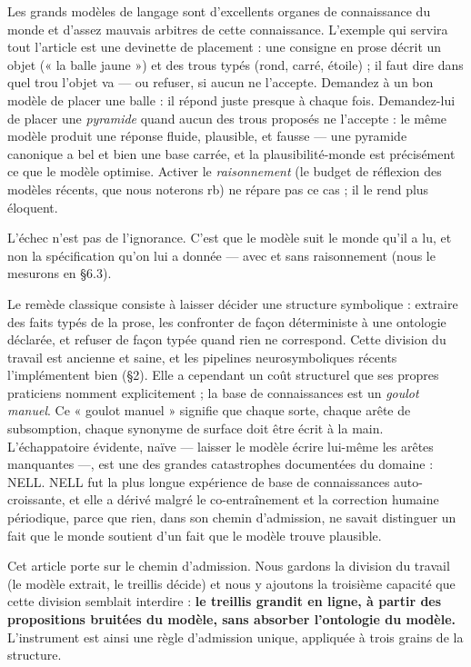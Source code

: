 \documentclass[11pt]{article}
\begin{document}
Les grands modèles de langage sont d'excellents organes de connaissance du monde et d'assez mauvais arbitres de cette connaissance. L'exemple qui servira tout l'article est une devinette de placement : une consigne en prose décrit un objet (« la balle jaune ») et des trous typés (rond, carré, étoile) ; il faut dire dans quel trou l'objet va — ou refuser, si aucun ne l'accepte. Demandez à un bon modèle de placer une balle : il répond juste presque à chaque fois. Demandez-lui de placer une \emph{pyramide} quand aucun des trous proposés ne l'accepte : le même modèle produit une réponse fluide, plausible, et fausse — une pyramide canonique a bel et bien une base carrée, et la plausibilité-monde est précisément ce que le modèle optimise. Activer le \emph{raisonnement} (le budget de réflexion des modèles récents, que nous noterons rb) ne répare pas ce cas ; il le rend plus éloquent.

L'échec n'est pas de l'ignorance. C'est que le modèle suit le monde qu'il a lu, et non la spécification qu'on lui a donnée — avec et sans raisonnement (nous le mesurons en §6.3).

Le remède classique consiste à laisser décider une structure symbolique : extraire des faits typés de la prose, les confronter de façon déterministe à une ontologie déclarée, et refuser de façon typée quand rien ne correspond. Cette division du travail est ancienne et saine, et les pipelines neurosymboliques récents l'implémentent bien (§2). Elle a cependant un coût structurel que ses propres praticiens nomment explicitement ; la base de connaissances est un \emph{goulot manuel}. Ce « goulot manuel » signifie que chaque sorte, chaque arête de subsomption, chaque synonyme de surface doit être écrit à la main. L'échappatoire évidente, naïve — laisser le modèle écrire lui-même les arêtes manquantes —, est une des grandes catastrophes documentées du domaine : NELL. NELL fut la plus longue expérience de base de connaissances auto-croissante, et elle a dérivé malgré le co-entraînement et la correction humaine périodique, parce que rien, dans son chemin d'admission, ne savait distinguer un fait que le monde soutient d'un fait que le modèle trouve plausible.

Cet article porte sur le chemin d'admission. Nous gardons la division du travail (le modèle extrait, le treillis décide) et nous y ajoutons la troisième capacité que cette division semblait interdire : \textbf{le treillis grandit en ligne, à partir des propositions bruitées du modèle, sans absorber l'ontologie du modèle.} L'instrument est ainsi une règle d'admission unique, appliquée à trois grains de la structure.
\end{document}
